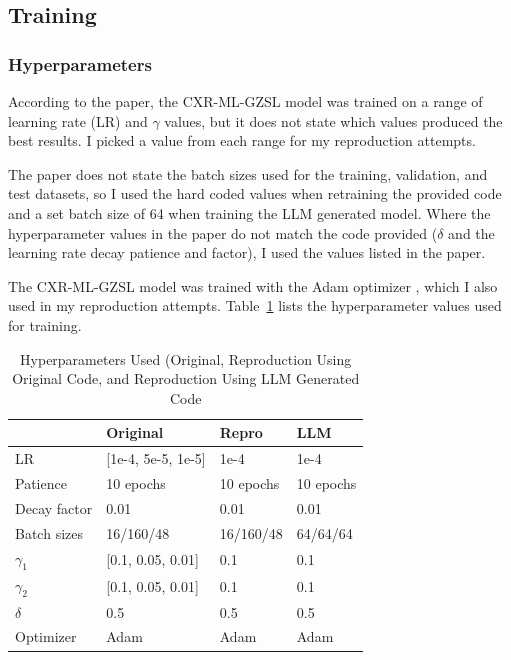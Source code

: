 \documentclass[letterpaper]{article} %
\begin{document}
\subsection{Training}

\subsubsection{Hyperparameters}

According to the paper, the CXR-ML-GZSL model was trained on a range of learning rate (LR) and $\gamma$ values, but it does not state which values produced the best results. I picked a value from each range for my reproduction attempts.

The paper does not state the batch sizes used for the training, validation, and test datasets, so I used the hard coded values when retraining the provided code and a set batch size of 64 when training the LLM generated model. Where the hyperparameter values in the paper do not match the code provided ($\delta$ and the learning rate decay patience and factor), I used the values listed in the paper.

The CXR-ML-GZSL model was trained with the Adam optimizer \cite{kingma2017adammethodstochasticoptimization}, which I also used in my reproduction attempts. Table~\ref{tab:hyperparameters} lists the hyperparameter values used for training.

\begin{table}[h!]
\centering
\begin{tabular}{|l|l|l|l|}
\hline
\textbf{} & \textbf{Original} & \textbf{Repro} & \textbf{LLM} \\
\hline
LR & [1e-4, 5e-5, 1e-5] & 1e-4 & 1e-4 \\
Patience & 10 epochs & 10 epochs & 10 epochs \\
Decay factor & 0.01 & 0.01 & 0.01 \\
Batch sizes & 16/160/48 & 16/160/48 & 64/64/64 \\
$\gamma_1$ & [0.1, 0.05, 0.01] & 0.1 & 0.1 \\
$\gamma_2$ & [0.1, 0.05, 0.01] & 0.1 & 0.1 \\
$\delta$ & 0.5 & 0.5 & 0.5 \\
Optimizer & Adam & Adam & Adam \\
\hline
\end{tabular}
\caption{Hyperparameters Used (Original, Reproduction Using Original Code, and Reproduction Using LLM Generated Code}
\label{tab:hyperparameters}
\end{table}
\end{document}
